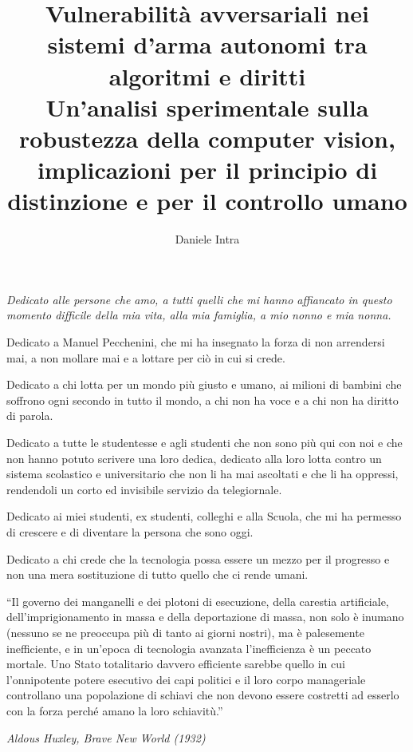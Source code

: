 \documentclass[a4paper,12pt]{report}
\begin{document}
\title{Vulnerabilità avversariali nei sistemi d'arma autonomi tra algoritmi e diritti \\[1em]
{\Large\mdseries Un'analisi sperimentale sulla robustezza della computer vision, implicazioni per il principio di distinzione e per il controllo umano}}
\author{Daniele Intra}

\beforepreface

\begin{flushright}
\begin{minipage}{1\textwidth}
\Large\sl
Dedicato alle persone che amo, a tutti quelli che mi hanno affiancato in questo momento difficile della mia vita, alla mia famiglia, a mio nonno e mia nonna.

Dedicato a Manuel Pecchenini, che mi ha insegnato la forza di non arrendersi mai, a non mollare mai e a lottare per ciò in cui si crede.

Dedicato a chi lotta per un mondo più giusto e umano, ai milioni di bambini che soffrono ogni secondo in tutto il mondo, a chi non ha voce e a chi non ha diritto di parola.

Dedicato a tutte le studentesse e agli studenti che non sono più qui con noi e che non hanno potuto scrivere una loro dedica, dedicato alla loro lotta contro un sistema scolastico e universitario che non li ha mai ascoltati e che li ha oppressi, rendendoli un corto ed invisibile servizio da telegiornale.

Dedicato ai miei studenti, ex studenti, colleghi e alla Scuola, che mi ha permesso di crescere e di diventare la persona che sono oggi.

Dedicato a chi crede che la tecnologia possa essere un mezzo per il progresso e non una mera sostituzione di tutto quello che ci rende umani.
\end{minipage}
\end{flushright}

\begin{flushright}
\begin{minipage}{0.6\textwidth}
\epigraph{
    ``Il governo dei manganelli e dei plotoni di esecuzione, della carestia artificiale, dell'imprigionamento in massa e della deportazione di massa, non solo è inumano (nessuno se ne preoccupa più di tanto ai giorni nostri), ma è palesemente inefficiente, e in un'epoca di tecnologia avanzata l'inefficienza è un peccato mortale. Uno Stato totalitario davvero efficiente sarebbe quello in cui l'onnipotente potere esecutivo dei capi politici e il loro corpo manageriale controllano una popolazione di schiavi che non devono essere costretti ad esserlo con la forza perché amano la loro schiavitù.''
}{\textit{Aldous Huxley, Brave New World (1932)}}
\end{minipage}
\end{flushright}
\end{document}
